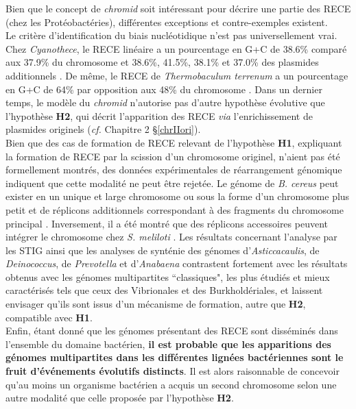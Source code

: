     Bien que le concept de \textit{chromid} soit intéressant pour décrire une partie des RECE (chez les Protéobactéries), différentes exceptions et contre-exemples existent. \\
    Le critère d'identification du biais nucléotidique n'est pas universellement vrai. Chez \textit{Cyanothece}, le RECE linéaire a un pourcentage en G+C de 38.6\% comparé aux 37.9\% du chromosome et 38.6\%, 41.5\%, 38.1\% et 37.0\% des plasmides additionnels \citep{Welsh2008}. De même, le RECE de \textit{Thermobaculum terrenum} a un pourcentage en G+C de 64\% par opposition aux 48\% du chromosome \citep{Kiss2010}. Dans un dernier temps, le modèle du \textit{chromid} n'autorise pas d'autre hypothèse évolutive que l'hypothèse \textbf{H2}, qui décrit l'apparition des RECE \textit{via} l'enrichissement de plasmides originels (\textit{cf.} Chapitre 2 \S \ref{chrIIori}).\\ 
    Bien que des cas de formation de RECE relevant de l'hypothèse \textbf{H1}, expliquant la formation de RECE par la scission d'un chromosome originel, n'aient pas été formellement montrés, des données expérimentales de réarrangement génomique indiquent que cette modalité ne peut être rejetée. Le génome de \textit{B. cereus} peut exister en un unique et large chromosome ou sous la forme d'un chromosome plus petit et de réplicons additionnels correspondant à des fragments du chromosome principal \citep{carlson1994small}. Inversement, il a été montré que des réplicons accessoires peuvent intégrer le chromosome chez \textit{S. meliloti} \citep{guo2003natural}.
Les résultats concernant l'analyse par les STIG ainsi que les analyses de synténie des génomes d'\textit{Asticcacaulis}, de \textit{Deinococcus}, de \textit{Prevotella} et d'\textit{Anabaena} contrastent fortement avec les résultats obtenus avec les génomes multipartites ``classiques", les plus étudiés et mieux caractérisés tels que ceux des Vibrionales et des Burkholdériales, et laissent envisager qu'ils sont issus d'un mécanisme de formation, autre que \textbf{H2}, compatible avec \textbf{H1}.\\   
     Enfin, étant donné que les génomes présentant des RECE sont disséminés dans l'ensemble du domaine bactérien, {\color{orange}\textbf{il est probable que les apparitions des génomes multipartites dans les différentes lignées bactériennes sont le fruit d'événements évolutifs distincts}}. Il est alors raisonnable de concevoir qu'au moins un organisme bactérien a acquis un second chromosome selon une autre modalité que celle proposée par l'hypothèse \textbf{H2}.   
